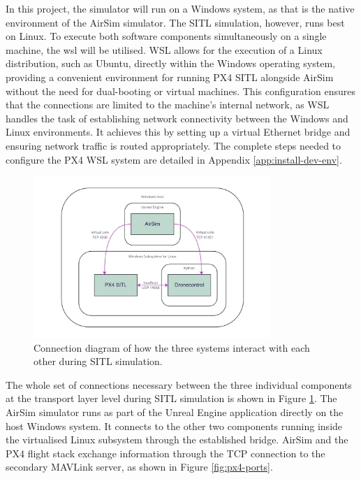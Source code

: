 In this project, the simulator will run on a Windows system, as that is the native environment of the AirSim simulator. The SITL simulation, however, runs best on Linux. To execute both software components simultaneously on a single machine, the \acrfull{wsl} \cite{wsl-learn} will be utilised. WSL allows for the execution of a Linux distribution, such as Ubuntu, directly within the Windows operating system, providing a convenient environment for running PX4 SITL alongside AirSim without the need for dual-booting or virtual machines. This configuration ensures that the connections are limited to the machine’s internal network, as WSL handles the task of establishing network connectivity between the Windows and Linux environments. It achieves this by setting up a virtual Ethernet bridge and ensuring network traffic is routed appropriately.
The complete steps needed to configure the PX4 WSL system are detailed in Appendix \ref{app:install-dev-env}.


\begin{figure}
  \centering
  \includegraphics[width=0.8\textwidth,keepaspectratio]{img/sitl-connections.jpg}
  \caption{Connection diagram of how the three systems interact with each other during SITL simulation.}
  \label{fig:sitl-connections}
\end{figure}

The whole set of connections necessary between the three individual components at the transport layer level during SITL simulation is shown in Figure \ref{fig:sitl-connections}.
The AirSim simulator runs as part of the Unreal Engine application directly on the host Windows system. It connects to the other two components running inside the virtualised Linux subsystem through the established bridge. AirSim and the PX4 flight stack exchange information through the TCP connection to the secondary MAVLink server, as shown in Figure \ref{fig:px4-ports}.

